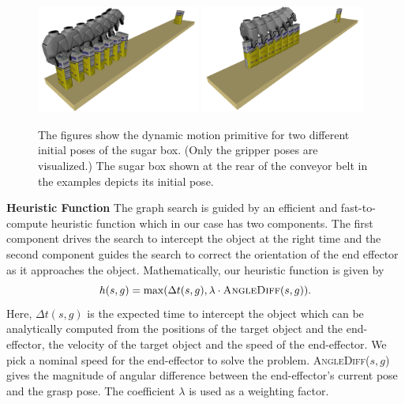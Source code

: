 \documentclass[a4paper]{report}
\begin{document}
\begin{figure}[t]
    \centering
         \includegraphics[width=0.48\textwidth]{amp1.png}
         \includegraphics[width=0.48\textwidth]{amp2.png}
    \caption{
    The figures show the dynamic motion primitive for two different initial poses of the sugar box. (Only the gripper poses are visualized.) The sugar box shown at the rear of the conveyor belt in the examples depicts its initial pose.
    }
    \label{fig:amp}
\end{figure}

\textbf{Heuristic Function}
The graph search is guided by an efficient and fast-to-compute heuristic function which in our case has two components.
The first component drives the search to intercept the object at the right time and 
the second component guides the search to correct the orientation of the end effector as it approaches the object. 
Mathematically, our heuristic function is given by
\begin{equation} \label{eq:h1}
 h(s,g) = \max (\Delta t(s,g), \lambda \cdot \textsc{AngleDiff}(s,g)).
\end{equation}
Here, $\Delta t(s,g)$ is the expected time to intercept the object which can be analytically computed from the positions of the target object and the end-effector, the velocity of the target object and the speed of the end-effector. We pick a nominal speed for the end-effector to solve the problem. \textsc{AngleDiff}($s,g$) gives the magnitude of angular difference between the end-effector's current pose and the grasp pose. The coefficient $\lambda$ is used as a weighting factor.
\end{document}
